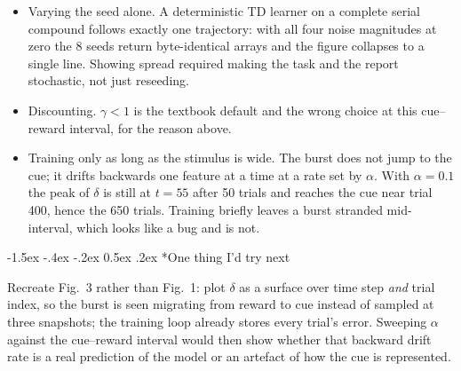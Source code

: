 \documentclass[10pt]{article}
\makeatletter
\renewcommand\section{\@startsection{section}{1}{\z@}%
  {-1.5ex \@plus -.4ex \@minus -.2ex}%
  {0.5ex \@plus .2ex}%
  {\normalfont\bfseries}}
\makeatother
\begin{document}
\begin{itemize}
  \item Varying the seed alone. A deterministic TD learner on a complete serial compound
  follows exactly one trajectory: with all four noise magnitudes at zero the 8 seeds return
  byte-identical arrays and the figure collapses to a single line. Showing spread required making the
  task and the report stochastic, not just reseeding.
  \item Discounting. $\gamma < 1$ is the textbook default and the wrong choice at this
  cue--reward interval, for the reason above.
  \item Training only as long as the stimulus is wide. The burst does not jump to the cue;
  it drifts backwards one feature at a time at a rate set by $\alpha$. With $\alpha = 0.1$ the peak
  of $\delta$ is still at $t=55$ after 50 trials and reaches the cue near trial 400, hence the 650
  trials. Training briefly leaves a burst stranded mid-interval, which looks like a bug and is not.
\end{itemize}

\section*{One thing I'd try next}

Recreate Fig.~3 rather than Fig.~1: plot $\delta$ as a surface over time step \emph{and} trial index,
so the burst is seen migrating from reward to cue instead of sampled at three snapshots; the
training loop already stores every trial's error. Sweeping $\alpha$ against the cue--reward interval
would then show whether that backward drift rate is a real prediction of the model or an artefact of
how the cue is represented.
\end{document}
